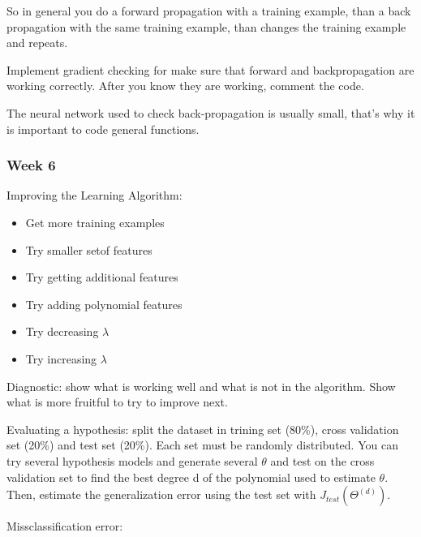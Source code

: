 \documentclass[12pt,a4paper]{report}
\begin{document}
	So in general you do a forward propagation with a training example, than a back propagation with the same training example, than changes the training example and repeats.
	
	Implement gradient checking for make sure that forward and backpropagation are working correctly. After you know they are working, comment the code.
	
	The neural network used to check back-propagation is usually small, that's why it is important to code general functions.
	
	\subsubsection{Week 6}
Improving the Learning Algorithm:

	
	
	\begin{itemize}
	\item Get more training examples
	\item Try smaller setof features
	\item Try getting additional features
	\item Try adding polynomial features
	\item Try decreasing $\lambda$
	\item Try increasing $\lambda$
	\end{itemize}
	
	Diagnostic: show what is working well and what is not in the algorithm. Show what is more fruitful to try to improve next.
	
	Evaluating a hypothesis: split the dataset in trining set (80\%), cross validation set (20\%) and test set (20\%). Each set must be randomly distributed. You can try several hypothesis models and generate several $\theta$ and test on the cross validation set to find the best degree d of the polynomial used to estimate $\theta$. Then, estimate the generalization error using the test set with $J_{test}(\Theta^{(d)})$.
	
	Missclassification error: 

\end{document}
